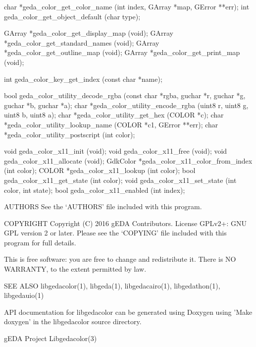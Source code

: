                        char    *geda_color_get_color_name        (int   index,
              GArray *map, GError **err);
                        int    geda_color_get_object_default   (char type);

                     GArray   *geda_color_get_display_map      (void);
                     GArray   *geda_color_get_standard_names   (void);
                     GArray   *geda_color_get_outline_map      (void);
                     GArray   *geda_color_get_print_map        (void);

                        int      geda_color_key_get_index         (const  char
              *name);

                       bool     geda_color_utility_decode_rgba   (const   char
              *rgba, guchar *r, guchar *g, guchar *b, guchar *a);
                       char   *geda_color_utility_encode_rgba  (uint8 r, uint8
              g, uint8 b, uint8 a);
                       char   *geda_color_utility_get_hex      (COLOR *c);
                       char    *geda_color_utility_lookup_name   (COLOR   *c1,
              GError **err);
                       char   *geda_color_utility_postscript   (int color);

                       void    geda_color_x11_init             (void);
                       void    geda_color_x11_free             (void);
                       void    geda_color_x11_allocate         (void);
                   GdkColor   *geda_color_x11_color_from_index (int color);
                      COLOR   *geda_color_x11_lookup           (int color);
                       bool    geda_color_x11_get_state        (int color);
                       void    geda_color_x11_set_state        (int color, int
              state);
                       bool    geda_color_x11_enabled          (int index);


AUTHORS
       See the `AUTHORS' file included with this program.


COPYRIGHT
       Copyright (C) 2016 gEDA Contributors. License GPLv2+: GNU GPL
       version 2 or later. Please see the `COPYING' file included with this
       program for full details.

       This is free software: you are free to change and redistribute it.
       There is NO WARRANTY, to the extent permitted by law.


SEE ALSO
       libgedacolor(1),    libgeda(1),    libgedacairo(1),     libgedathon(1),
       libgedauio(1)

       API documentation for libgedacolor can be generated using Doxygen using
       'Make doxygen' in the libgedacolor source directory.



gEDA Project                                                   Libgedacolor(3)
